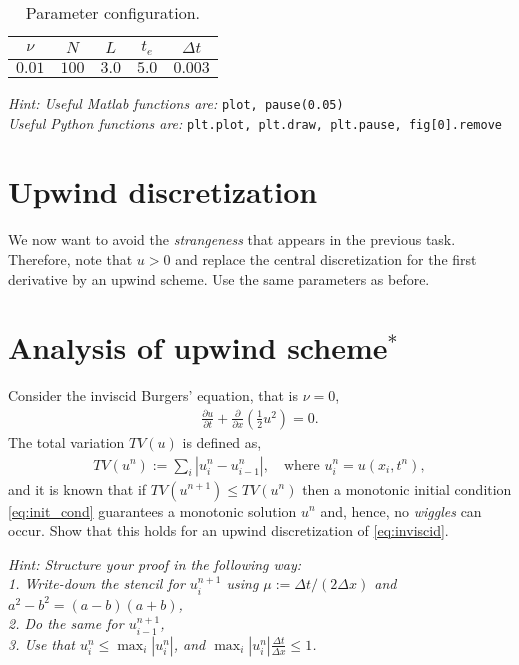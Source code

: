 \documentclass[a4paper,10pt]{article}
\begin{document}
\begin{table}[ht]
\centering
 \begin{tabular}{|c|c|c|c|c|}
  \hline
  $\nu$ & $N$ & $L$ & $t_e$ & $\Delta t$\\
  \hline
  $0.01$ & $100$ & $3.0$ & $5.0$ & $0.003$\\
  \hline
 \end{tabular}
\caption{Parameter configuration.}\label{params}
\end{table}
\textit{Hint: Useful Matlab functions are: } \texttt{plot, pause(0.05) }\\
\textit{\phantom{\indent Hint:} Useful Python functions are: } \texttt{plt.plot, plt.draw, plt.pause, fig[0].remove}
\section{Upwind discretization}
We now want to avoid the \textit{strangeness} that appears in the previous task. Therefore, note that $u>0$ and replace the central discretization for the first derivative by an upwind scheme. Use the same parameters as before.
\section{Analysis of upwind scheme$^\ast$}
Consider the inviscid Burgers' equation, that is $\nu = 0$,
\begin{align}
\label{eq:inviscid}
 \frac{\partial u}{\partial t} + \frac{\partial}{\partial x} \left( \frac{1}{2}u^2 \right) = 0.
\end{align}
The total variation $TV(u)$ is defined as,
\begin{align*}
TV(u^{n}) := \sum_{i} |u_i^{n} - u_{i-1}^{n}|, \quad \text{where } u_i^n = u(x_i,t^n),
\end{align*}
and it is known that if $TV(u^{n+1}) \leq TV(u^{n})$ then a monotonic initial condition \eqref{eq:init_cond} guarantees a monotonic solution $u^n$ and, hence, no \textit{wiggles} can occur. Show that this holds for an upwind discretization of \eqref{eq:inviscid}.

\textit{Hint: Structure your proof in the following way:\\
       \phantom{\indent Hint: }1. Write-down the stencil for $u_i^{n+1}$ using $\mu:=\Delta t/(2 \Delta x)$ and $a^2-b^2 = (a-b)(a+b)$,\\
       \phantom{\indent Hint: }2. Do the same for $u_{i-1}^{n+1}$,\\
       \phantom{\indent Hint: }3. Use that $u_i^n \leq \max_i |u_i^n|$, and $\max_i |u_i^n| \frac{\Delta t}{\Delta x} \leq 1$.}
\end{document}
